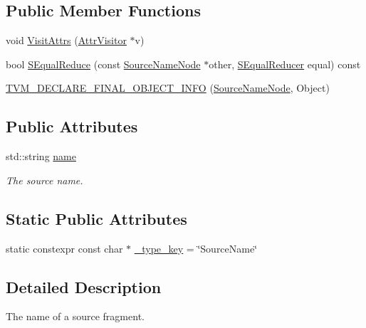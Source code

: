 \subsection*{Public Member Functions}
\begin{DoxyCompactItemize}
\item 
void \hyperlink{classtvm_1_1SourceNameNode_acbea8729c55af6e2451338e2be5a84ce}{Visit\+Attrs} (\hyperlink{classtvm_1_1AttrVisitor}{Attr\+Visitor} $\ast$v)
\item 
bool \hyperlink{classtvm_1_1SourceNameNode_a1ab3c95ef12535d40584098af7488673}{S\+Equal\+Reduce} (const \hyperlink{classtvm_1_1SourceNameNode}{Source\+Name\+Node} $\ast$other, \hyperlink{classtvm_1_1SEqualReducer}{S\+Equal\+Reducer} equal) const 
\item 
\hyperlink{classtvm_1_1SourceNameNode_a61a9f7923b7dd684274e9ce4045ffa13}{T\+V\+M\+\_\+\+D\+E\+C\+L\+A\+R\+E\+\_\+\+F\+I\+N\+A\+L\+\_\+\+O\+B\+J\+E\+C\+T\+\_\+\+I\+N\+FO} (\hyperlink{classtvm_1_1SourceNameNode}{Source\+Name\+Node}, Object)
\end{DoxyCompactItemize}
\subsection*{Public Attributes}
\begin{DoxyCompactItemize}
\item 
std\+::string \hyperlink{classtvm_1_1SourceNameNode_a92e5e928cfdb8d7f4efd09f63d6632c7}{name}
\begin{DoxyCompactList}\small\item\em The source name. \end{DoxyCompactList}\end{DoxyCompactItemize}
\subsection*{Static Public Attributes}
\begin{DoxyCompactItemize}
\item 
static constexpr const char $\ast$ \hyperlink{classtvm_1_1SourceNameNode_a5a950f6576d6e5e4de7b0adc1cac260c}{\+\_\+type\+\_\+key} = \char`\"{}Source\+Name\char`\"{}
\end{DoxyCompactItemize}


\subsection{Detailed Description}
The name of a source fragment. 

